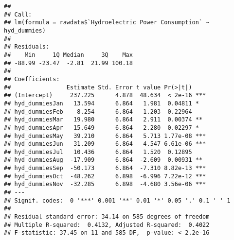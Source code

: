 \documentclass[
]{article}
\newenvironment{Shaded}{\begin{snugshade}}{\end{snugshade}}
\newcommand{\AttributeTok}[1]{\textcolor[rgb]{0.77,0.63,0.00}{#1}}
\newcommand{\CommentTok}[1]{\textcolor[rgb]{0.56,0.35,0.01}{\textit{#1}}}
\newcommand{\DecValTok}[1]{\textcolor[rgb]{0.00,0.00,0.81}{#1}}
\newcommand{\DocumentationTok}[1]{\textcolor[rgb]{0.56,0.35,0.01}{\textbf{\textit{#1}}}}
\newcommand{\FunctionTok}[1]{\textcolor[rgb]{0.00,0.00,0.00}{#1}}
\newcommand{\NormalTok}[1]{#1}
\newcommand{\OtherTok}[1]{\textcolor[rgb]{0.56,0.35,0.01}{#1}}
\newcommand{\SpecialCharTok}[1]{\textcolor[rgb]{0.00,0.00,0.00}{#1}}
\newcommand{\StringTok}[1]{\textcolor[rgb]{0.31,0.60,0.02}{#1}}
\begin{document}
\begin{Shaded}
\end{Shaded}

\begin{verbatim}
## 
## Call:
## lm(formula = rawdata$`Hydroelectric Power Consumption` ~ hyd_dummies)
## 
## Residuals:
##    Min     1Q Median     3Q    Max 
## -88.99 -23.47  -2.81  21.99 100.18 
## 
## Coefficients:
##                Estimate Std. Error t value Pr(>|t|)    
## (Intercept)     237.225      4.878  48.634  < 2e-16 ***
## hyd_dummiesJan   13.594      6.864   1.981  0.04811 *  
## hyd_dummiesFeb   -8.254      6.864  -1.203  0.22964    
## hyd_dummiesMar   19.980      6.864   2.911  0.00374 ** 
## hyd_dummiesApr   15.649      6.864   2.280  0.02297 *  
## hyd_dummiesMay   39.210      6.864   5.713 1.77e-08 ***
## hyd_dummiesJun   31.209      6.864   4.547 6.61e-06 ***
## hyd_dummiesJul   10.436      6.864   1.520  0.12895    
## hyd_dummiesAug  -17.909      6.864  -2.609  0.00931 ** 
## hyd_dummiesSep  -50.173      6.864  -7.310 8.82e-13 ***
## hyd_dummiesOct  -48.262      6.898  -6.996 7.22e-12 ***
## hyd_dummiesNov  -32.285      6.898  -4.680 3.56e-06 ***
## ---
## Signif. codes:  0 '***' 0.001 '**' 0.01 '*' 0.05 '.' 0.1 ' ' 1
## 
## Residual standard error: 34.14 on 585 degrees of freedom
## Multiple R-squared:  0.4132, Adjusted R-squared:  0.4022 
## F-statistic: 37.45 on 11 and 585 DF,  p-value: < 2.2e-16
\end{verbatim}
\end{document}
